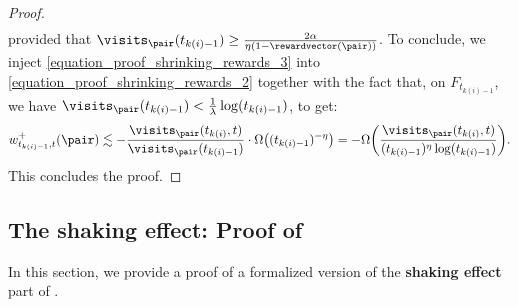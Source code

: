 \documentclass[preprint,cleveref,12pt]{colt2025}
\DeclarePairedDelimiter{\parens}{(}{)}	%
\def\reward{\rewardvector}
\newcommand{\strong}[1]{\textbf{#1}}
\begin{document}
\begin{proof}
\begin{align}
{            }
        \end{align}
        provided that $\visits_\pair (t_{k(i)-1}) \ge \frac{2\alpha}{\eta(1 - \reward(\pair))}$. 
        To conclude, we inject \eqref{equation_proof_shrinking_rewards_3} into \eqref{equation_proof_shrinking_rewards_2} together with the fact that, on $F_{t_{k(i)-1}}$, we have $\visits_\pair (t_{k(i)-1}) < \frac 1\lambda \log(t_{k(i)-1})$, to get:
        \begin{equation*}
            w^+_{t_{k(i)-1}, t}(\pair)
            \lesssim
            - \frac{
                \visits_\pair(t_{k(i)}, t)
            }{\visits_\pair(t_{k(i)-1})}
            \cdot \Omega \parens*{
                (t_{k(i)-1})^{-\eta}
            }
            =
            - \Omega \parens*{
                \frac{
                    \visits_\pair(t_{k(i)}, t)
                }{
                    (t_{k(i)-1})^\eta \log(t_{k(i)-1})
                }
            }
            .
        \end{equation*}
        This concludes the proof. 
    \end{proof}

    \subsection{The shaking effect: Proof of }
    \label{appendix_shaking}

    In this section, we provide a proof of a formalized version of the \strong{shaking effect} part of .
\end{document}
